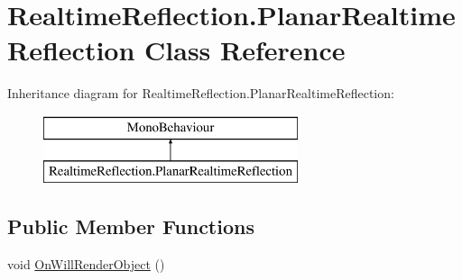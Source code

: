 \hypertarget{class_realtime_reflection_1_1_planar_realtime_reflection}{}\section{Realtime\+Reflection.\+Planar\+Realtime\+Reflection Class Reference}
\label{class_realtime_reflection_1_1_planar_realtime_reflection}
Inheritance diagram for Realtime\+Reflection.\+Planar\+Realtime\+Reflection\+:\begin{figure}[H]
\begin{center}
\leavevmode
\includegraphics[height=2.000000cm]{class_realtime_reflection_1_1_planar_realtime_reflection}
\end{center}
\end{figure}
\subsection*{Public Member Functions}
\begin{DoxyCompactItemize}
\item 
void \mbox{\hyperlink{class_realtime_reflection_1_1_planar_realtime_reflection_abe788c5885846bec18505789d54c6a84}{On\+Will\+Render\+Object}} ()
\end{DoxyCompactItemize}
